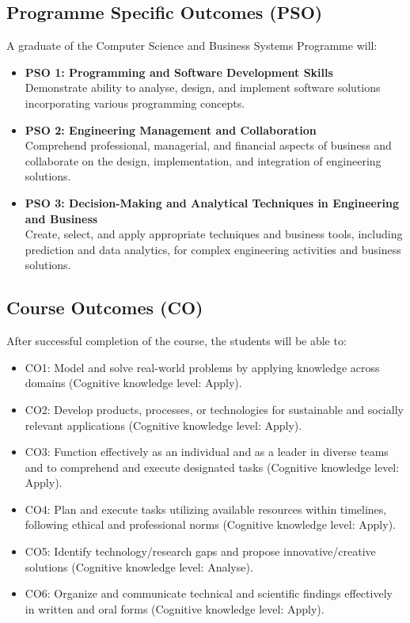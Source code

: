 \subsection*{Programme Specific Outcomes (PSO)}

A graduate of the Computer Science and Business Systems Programme will:
\begin{itemize}
	\item \textbf{PSO 1: Programming and Software Development Skills} \\
	      Demonstrate ability to analyse, design, and implement software solutions incorporating various programming concepts.
	\item \textbf{PSO 2: Engineering Management and Collaboration} \\
	      Comprehend professional, managerial, and financial aspects of business and collaborate on the design, implementation, and integration of engineering solutions.
	\item \textbf{PSO 3: Decision-Making and Analytical Techniques in Engineering and Business} \\
	      Create, select, and apply appropriate techniques and business tools, including prediction and data analytics, for complex engineering activities and business solutions.
\end{itemize}

\subsection*{Course Outcomes (CO)}

After successful completion of the course, the students will be able to:
\begin{itemize}
	\item {CO1:} Model and solve real-world problems by applying knowledge across domains (Cognitive knowledge level: Apply).
	\item {CO2:} Develop products, processes, or technologies for sustainable and socially relevant applications (Cognitive knowledge level: Apply).
	\item {CO3:} Function effectively as an individual and as a leader in diverse teams and to comprehend and execute designated tasks (Cognitive knowledge level: Apply).
	\item {CO4:} Plan and execute tasks utilizing available resources within timelines, following ethical and professional norms (Cognitive knowledge level: Apply).
	\item{CO5:} Identify technology/research gaps and propose innovative/creative solutions (Cognitive knowledge level: Analyse).
	\item {CO6:} Organize and communicate technical and scientific findings effectively in written and oral forms (Cognitive knowledge level: Apply).
\end{itemize}
